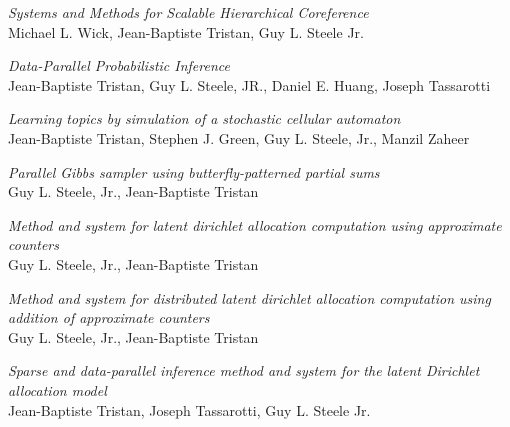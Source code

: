 \documentclass[margin,line]{res}
\begin{document}
\begin{resume}
\emph{Systems and Methods for Scalable Hierarchical Coreference}\\
Michael L. Wick, Jean-Baptiste Tristan, Guy L. Steele Jr.

\emph{Data-Parallel Probabilistic Inference}\\
Jean-Baptiste Tristan, Guy L. Steele, JR., Daniel E. Huang, Joseph Tassarotti

\emph{Learning topics by simulation of a stochastic cellular automaton}\\
Jean-Baptiste Tristan, Stephen J. Green, Guy L. Steele, Jr., Manzil Zaheer

\emph{Parallel Gibbs sampler using butterfly-patterned partial sums}\\
Guy L. Steele, Jr., Jean-Baptiste Tristan

\emph{Method and system for latent dirichlet allocation computation using approximate counters}\\
Guy L. Steele, Jr., Jean-Baptiste Tristan

\emph{Method and system for distributed latent dirichlet allocation computation using addition of approximate counters}\\
Guy L. Steele, Jr., Jean-Baptiste Tristan

\emph{Sparse and data-parallel inference method and system for the latent Dirichlet allocation model}\\
Jean-Baptiste Tristan, Joseph Tassarotti, Guy L. Steele Jr.




\end{resume}
\end{document}
